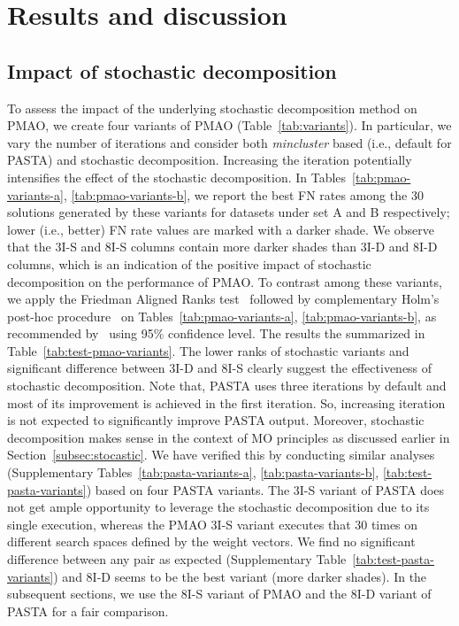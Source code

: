 \section{Results and discussion}
\label{sec:experiment}

\subsection{Impact of stochastic decomposition}
To assess the impact of the underlying stochastic decomposition method on PMAO, we create four variants of PMAO (Table~\ref{tab:variants}). In particular, we vary the number of iterations and consider both \textit{mincluster} based (i.e., default for PASTA) and stochastic decomposition. Increasing the iteration potentially intensifies the effect of the stochastic decomposition. In Tables~\ref{tab:pmao-variants-a},  \ref{tab:pmao-variants-b}, we report the best FN rates among the 30 solutions generated by these variants for datasets under set A and B respectively; lower (i.e., better) FN rate values are marked with a darker shade.
We observe that the 3I-S and 8I-S columns contain more darker shades than 3I-D and 8I-D columns, which is an indication of the positive impact of stochastic decomposition on the performance of PMAO. To contrast among these variants, we apply the Friedman Aligned Ranks test~\cite{hodges2012rank} followed by complementary Holm’s post-hoc procedure~\cite{holm1979simple} on Tables~\ref{tab:pmao-variants-a},  \ref{tab:pmao-variants-b}, as recommended by~\cite{derrac2011practical, rodriguez-fdez2015stac} using 95\% confidence level. The results the summarized in Table~\ref{tab:test-pmao-variants}. The lower ranks of stochastic variants and significant difference between 3I-D and 8I-S clearly suggest the effectiveness of stochastic decomposition. Note that, PASTA uses three iterations by default and most of its improvement is achieved in the first iteration. So, increasing iteration is not expected to significantly improve PASTA output. Moreover, stochastic decomposition makes sense in the context of MO principles as discussed earlier in Section~\ref{subsec:stocastic}. We have verified this by conducting similar analyses (Supplementary Tables~\ref{tab:pasta-variants-a}, \ref{tab:pasta-variants-b},  \ref{tab:test-pasta-variants}) based on four PASTA variants. The 3I-S variant of PASTA does not get ample opportunity to leverage the stochastic decomposition due to its single execution, whereas the PMAO 3I-S variant executes that 30 times on different search spaces defined by the weight vectors. We find no significant difference between any pair as expected (Supplementary Table~\ref{tab:test-pasta-variants}) and 8I-D seems to be the best variant (more darker shades). In the subsequent sections, we use the 8I-S variant of PMAO and the 8I-D variant of PASTA for a fair comparison. 


